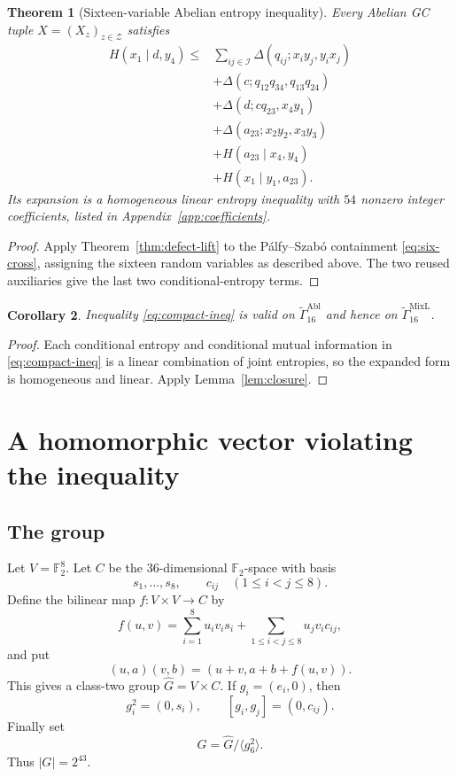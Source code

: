 \documentclass[journal]{IEEEtran}
\newtheorem{theorem}{Theorem}
\newtheorem{corollary}[theorem]{Corollary}
\newcommand{\MixL}{\widetilde\Gamma^{\mathrm{MixL}}}
\newcommand{\Abl}{\widetilde\Gamma^{\mathrm{Abl}}}
\newcommand{\Ftwo}{\mathbb F_2}
\begin{document}
\begin{theorem}[Sixteen-variable Abelian entropy inequality]\label{thm:abelian-ineq}
Every Abelian GC tuple $X=(X_z)_{z\in\mathcal Z}$ satisfies
\begin{align}\label{eq:compact-ineq}
 H(x_1\mid d,y_4)
 \le{}&
 \sum_{ij\in\mathcal I}
 \Delta(q_{ij};x_i y_j,y_i x_j) \\
 &+\Delta(c;q_{12}q_{34},q_{13}q_{24})\nonumber\\
 &+\Delta(d;cq_{23},x_4y_1)\nonumber\\
 &+\Delta(a_{23};x_2y_2,x_3y_3)\nonumber\\
 &+H(a_{23}\mid x_4,y_4)\nonumber\\
 &+H(x_1\mid y_1,a_{23}).\nonumber
\end{align}
Its expansion is a homogeneous linear entropy inequality with $54$ nonzero
integer coefficients, listed in Appendix~\ref{app:coefficients}.
\end{theorem}
\begin{proof}
Apply Theorem~\ref{thm:defect-lift} to the P\'alfy--Szab\'o containment
\eqref{eq:six-cross}, assigning the sixteen random variables as described
above.  The two reused auxiliaries give the last two conditional-entropy terms.
\end{proof}

\begin{corollary}\label{cor:abelian-cone}
Inequality \eqref{eq:compact-ineq} is valid on $\Abl_{16}$ and hence on
$\MixL_{16}$.
\end{corollary}
\begin{proof}
Each conditional entropy and conditional mutual information in
\eqref{eq:compact-ineq} is a linear combination of joint entropies, so the
expanded form is homogeneous and linear.  Apply Lemma~\ref{lem:closure}.
\end{proof}

\section{A homomorphic vector violating the inequality}\label{sec:witness}
\subsection{The group}
Let $V=\Ftwo^8$.  Let $C$ be the $36$-dimensional $\Ftwo$-space with basis
\[
  s_1,\ldots,s_8,\qquad c_{ij}\quad(1\le i<j\le8).
\]
Define the bilinear map $f:V\times V\to C$ by
\begin{equation}\label{eq:cocycle}
 f(u,v)=\sum_{i=1}^8u_iv_i s_i
       +\sum_{1\le i<j\le8}u_jv_i c_{ij},
\end{equation}
and put
\begin{equation}\label{eq:group-law}
 (u,a)(v,b)=(u+v,a+b+f(u,v)).
\end{equation}
This gives a class-two group $\widehat G=V\times C$.  If
$g_i=(e_i,0)$, then
\[
  g_i^2=(0,s_i),\qquad [g_i,g_j]=(0,c_{ij}).
\]
Finally set
\begin{equation}\label{eq:group-quotient}
  G=\widehat G/\langle g_6^2\rangle.
\end{equation}
Thus $|G|=2^{43}$.
\end{document}
